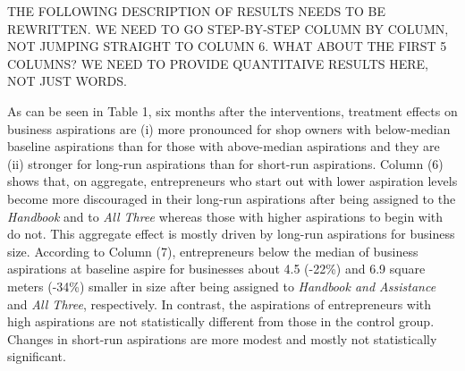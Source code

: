 \documentclass[11.5pt]{article}
\begin{document}
THE FOLLOWING DESCRIPTION OF RESULTS NEEDS TO BE REWRITTEN. WE NEED TO GO STEP-BY-STEP COLUMN BY COLUMN, NOT JUMPING STRAIGHT TO COLUMN 6. WHAT ABOUT THE FIRST 5 COLUMNS? WE NEED TO PROVIDE QUANTITAIVE RESULTS HERE, NOT JUST WORDS. 

As can be seen in Table 1, six months after the interventions, treatment effects on business aspirations are (i) more pronounced for shop owners with below-median baseline aspirations than for those with above-median aspirations and they are (ii) stronger for long-run aspirations than for short-run aspirations. Column (6) shows that, on aggregate, entrepreneurs who start out with lower aspiration levels become more discouraged in their long-run aspirations after being assigned to the \emph{Handbook} and to \emph{All Three} whereas those with higher aspirations to begin with do not. %
This aggregate effect is mostly driven by long-run aspirations for business size. According to Column (7), entrepreneurs below the median of business aspirations at baseline aspire for businesses about 4.5 (-22\%) and 6.9 square meters (-34\%) smaller in size after being assigned to \emph{Handbook and Assistance} and \emph{All Three}, respectively. In contrast, the aspirations of entrepreneurs with high aspirations are not statistically different from those in the control group. Changes in short-run aspirations are more modest and mostly not statistically significant. \\ %
\end{document}
